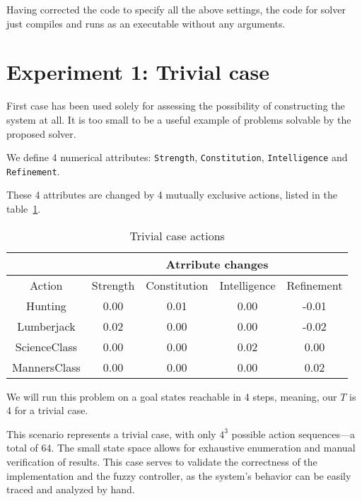 \documentclass[12pt, a4paper]{article}
\begin{document}
	Having corrected the code to specify all the above settings, the code for solver just compiles and runs as an executable without any arguments.
	
	\section{Experiment 1: Trivial case}\label{trivial-case}

	First case has been used solely for assessing the possibility of constructing the system at all.
	It is too small to be a useful example of problems solvable by the proposed solver.
	
	We define 4 numerical attributes: \texttt{Strength}, \texttt{Constitution}, \texttt{Intelligence} and \texttt{Refinement}.
	
	These 4 attributes are changed by 4 mutually exclusive actions, listed in the table~\ref{table::trivial-case-actions}.
	
\begin{table}[h!]
	\centering
	\caption{Trivial case actions}
	\label{table::trivial-case-actions}
	\begin{tabular}{|c|c|c|c|c|}
		\hline
		              &   \multicolumn{4}{|c|}{Atrribute changes}               \\ \hline
		Action        & Strength & Constitution &  Intelligence  & Refinement   \\ \hline
		Hunting       & 0.00     & 0.01         &  0.00          & -0.01        \\ \hline
		Lumberjack    & 0.02     & 0.00         &  0.00          & -0.02        \\ \hline
		ScienceClass  & 0.00     & 0.00         &  0.02          &  0.00        \\ \hline
		MannersClass  & 0.00     & 0.00         &  0.00          &  0.02        \\ \hline
	\end{tabular}
\end{table}

	We will run this problem on a goal states reachable in 4 steps, meaning, our $T$ is 4 for a trivial case.

	This scenario represents a trivial case, with only $4^{3}$ possible action sequences—a total of 64.
	The small state space allows for exhaustive enumeration and manual verification of results.
	This case serves to validate the correctness of the implementation and the fuzzy controller, as the system's behavior can be easily traced and analyzed by hand.
\end{document}
